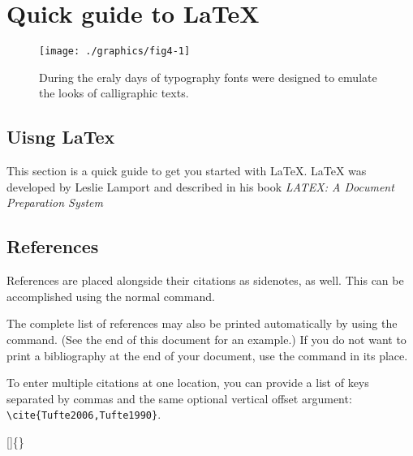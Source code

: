 

\chapter{Quick guide to LaTeX}         
\begin{figure}%
  \texttt{[image: ./graphics/fig4-1]}
  \caption{During the eraly days of typography fonts were designed to emulate the looks of calligraphic texts.}
  \label{fig:marginfig1}
\end{figure}
\section{Uisng LaTex}
This section is a quick guide to get you started with LaTeX. LaTeX was developed by Leslie Lamport and described in his book 
{\em LATEX: A Document Preparation System}\cite{Lamport1994}

\section{References}
References are placed alongside their citations as sidenotes,
as well.  This can be accomplished using the normal 
command.

The complete list of references may also be printed automatically by using
the  command.  (See the end of this document for an
example.)  If you do not want to print a bibliography at the end of your
document, use the  command in its place.  

To enter multiple citations at one location,\cite[-3\baselineskip]{Tufte2006,Tufte1990} you can
provide a list of keys separated by commas and the same optional vertical
offset argument: \verb+\cite{Tufte2006,Tufte1990}+.  
\begin{docspec}
  []\{\}
\end{docspec}